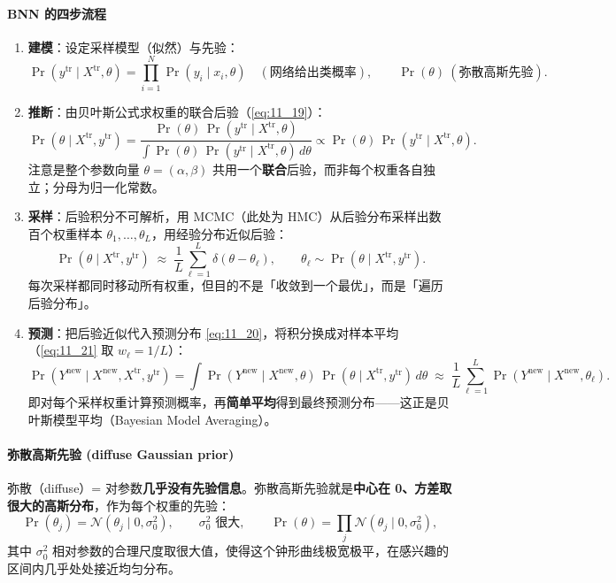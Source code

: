 \paragraph{BNN 的四步流程}

\begin{enumerate}
\item \textbf{建模}：设定采样模型（似然）与先验：
\[
\Pr(y^{\mathrm{tr}}\mid X^{\mathrm{tr}},\theta) = \prod_{i=1}^{N} \Pr(y_i\mid x_i,\theta) \quad(\text{网络给出类概率}), \qquad \Pr(\theta)\ (\text{弥散高斯先验}).
\]

\item \textbf{推断}：由贝叶斯公式求权重的联合后验（\ref{eq:11_19}）：
\[
\Pr(\theta\mid X^{\mathrm{tr}}, y^{\mathrm{tr}}) = \frac{\Pr(\theta)\, \Pr(y^{\mathrm{tr}}\mid X^{\mathrm{tr}},\theta)}{\int \Pr(\theta)\, \Pr(y^{\mathrm{tr}}\mid X^{\mathrm{tr}},\theta)\, d\theta} \propto \Pr(\theta)\, \Pr(y^{\mathrm{tr}}\mid X^{\mathrm{tr}},\theta).
\]
注意是整个参数向量 $\theta=(\alpha,\beta)$ 共用一个\textbf{联合}后验，而非每个权重各自独立；分母为归一化常数。

\item \textbf{采样}：后验积分不可解析，用 MCMC（此处为 HMC）从后验分布采样出数百个权重样本 $\theta_1,\dots,\theta_L$，用经验分布近似后验：
\[
\Pr(\theta\mid X^{\mathrm{tr}}, y^{\mathrm{tr}}) \;\approx\; \frac{1}{L}\sum_{\ell=1}^{L} \delta(\theta - \theta_\ell), \qquad \theta_\ell \sim \Pr(\theta\mid X^{\mathrm{tr}}, y^{\mathrm{tr}}).
\]
每次采样都同时移动所有权重，但目的不是「收敛到一个最优」，而是「遍历后验分布」。

\item \textbf{预测}：把后验近似代入预测分布 \ref{eq:11_20}，将积分换成对样本平均（\ref{eq:11_21} 取 $w_\ell=1/L$）：
\[
\Pr(Y^{\mathrm{new}}\mid X^{\mathrm{new}}, X^{\mathrm{tr}}, y^{\mathrm{tr}})
= \int \Pr(Y^{\mathrm{new}}\mid X^{\mathrm{new}},\theta)\, \Pr(\theta\mid X^{\mathrm{tr}}, y^{\mathrm{tr}})\, d\theta
\;\approx\; \frac{1}{L}\sum_{\ell=1}^{L} \Pr(Y^{\mathrm{new}}\mid X^{\mathrm{new}},\theta_\ell).
\]
即对每个采样权重计算预测概率，再\textbf{简单平均}得到最终预测分布——这正是贝叶斯模型平均（Bayesian Model Averaging）。
\end{enumerate}

\paragraph{弥散高斯先验 (diffuse Gaussian prior)}

\begin{definition}[弥散高斯先验]
弥散（diffuse）= 对参数\textbf{几乎没有先验信息}。弥散高斯先验就是\textbf{中心在 0、方差取很大的高斯分布}，作为每个权重的先验：
\[
\Pr(\theta_j) = \mathcal{N}(\theta_j \mid 0, \sigma_0^2), \qquad \sigma_0^2 \text{ 很大}, \qquad \Pr(\theta) = \prod_j \mathcal{N}(\theta_j \mid 0, \sigma_0^2),
\]
其中 $\sigma_0^2$ 相对参数的合理尺度取很大值，使得这个钟形曲线极宽极平，在感兴趣的区间内几乎处处接近均匀分布。
\end{definition}


